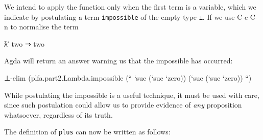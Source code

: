We intend to apply the function only when the first term is a variable,
which we indicate by postulating a term \texttt{impossible} of the empty
type \texttt{⊥}. If we use C-c C-n to normalise the term

\begin{myDisplay}
ƛ′ two ⇒ two
\end{myDisplay}

Agda will return an answer warning us that the impossible has occurred:

\begin{myDisplay}
⊥-elim (plfa.part2.Lambda.impossible (`` `suc (`suc `zero)) (`suc (`suc `zero)) ``)
\end{myDisplay}

While postulating the impossible is a useful technique, it must be used
with care, since such postulation could allow us to provide evidence of
\emph{any} proposition whatsoever, regardless of its truth.

The definition of \texttt{plus} can now be written as follows:

\begin{fence}
\begin{code}%
\>[0]\AgdaSpace{}%
\AgdaSymbol{:}\AgdaSpace{}%
\<%
\\
\>[0]\AgdaSpace{}%
\AgdaSymbol{=}%
\>[261I]\AgdaSpace{}%
\AgdaFunction{+}\AgdaSpace{}%
\AgdaSpace{}%
\AgdaSpace{}%
\AgdaSpace{}%
\AgdaSpace{}%
\AgdaSpace{}%
\AgdaSpace{}%
\<%
\\
\>[261I][@{}l@{\AgdaIndent{0}}]%
\>[10]\AgdaSpace{}%
\<%
\\
\>[10][@{}l@{\AgdaIndent{0}}]%
\>[12]\AgdaOperator{\AgdaFunction{[zero⇒}}\AgdaSpace{}%
\<%
\\
%
\>[12]\AgdaSpace{}%
\AgdaSpace{}%
\AgdaSpace{}%
\AgdaSpace{}%
\AgdaSymbol{(}\AgdaFunction{+}\AgdaSpace{}%
\AgdaSpace{}%
\AgdaSpace{}%
\AgdaSpace{}%
\AgdaSymbol{)}\AgdaSpace{}%
\AgdaOperator{\AgdaFunction{]}}\<%
\\
\>[0][@{}l@{\AgdaIndent{0}}]%
\>[2]\<%
\\
%
\>[2]\AgdaFunction{+}%
\>[5]\AgdaSymbol{=}%
\>[8]\AgdaSpace{}%
\<%
\\
%
\>[2]%
\>[5]\AgdaSymbol{=}%
\>[8]\AgdaSpace{}%
\<%
\\
%
\>[2]%
\>[5]\AgdaSymbol{=}%
\>[8]\AgdaSpace{}%
\<%
\end{code}
\end{fence}

